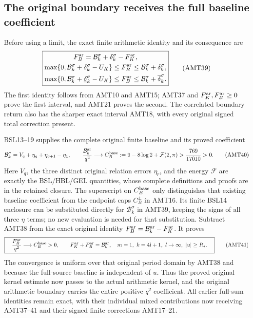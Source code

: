\documentclass[11pt,a4paper]{article}
\begin{document}
\subsection{The original boundary receives the full baseline coefficient}
Before using a limit, the exact finite arithmetic identity and its
consequence are
\[
\boxed{\begin{gathered}
 F_B^{\rm ar}=\mathcal B_k^\sigma+\delta_k^\sigma-F_K^{\rm ar},\\
 \max\{0,\mathcal B_k^\sigma+\delta_k^\sigma-U_K\}
    \le F_B^{\rm ar}\le\mathcal B_k^\sigma+\delta_k^\sigma,\\
 \max\{0,\mathcal B_k^\sigma+\underline\delta_k^\sigma-U_K\}
    \le F_B^{\rm ar}\le\mathcal B_k^\sigma+\overline\delta_k^\sigma.
\end{gathered}}\tag{AMT39}
\]
The first identity follows from AMT10 and AMT15; AMT37 and
$F_K^{\rm ar},F_B^{\rm ar}\ge0$ prove the first interval, and
AMT21 proves the second. The correlated boundary return also has
the sharper exact interval AMT18, with every original signed
total correction present.

BSL13--19 supplies the complete original finite baseline and its
proved coefficient
\[
 \mathcal B_k^\sigma=V_q+\eta_q+\eta_{q+1}-\eta_1,\qquad
 \frac{\mathcal B_k^{\rm ar}}{q^2}\longrightarrow
 C_B^{\rm base}:=9-8\log2+\mathcal F(2,\pi)
                      >\frac{769}{17010}>0.
 \tag{AMT40}
\]
Here $V_q$, the three distinct original relation errors $\eta_r$,
and the energy $\mathcal F$ are exactly the BSL/HBL/GEL quantities,
whose complete definitions and proofs are in the retained closure.
The superscript on $C_B^{\rm base}$ only distinguishes that existing
baseline coefficient from the endpoint caps $C_B^\pm$ in AMT16.
Its finite BSL14 enclosure can be substituted directly for
$\mathcal B_k^\sigma$ in AMT39, keeping the signs of all three
$\eta$ terms; no new evaluation is needed for that substitution.
Subtract AMT38 from the exact original identity
$F_B^{\rm ar}=\mathcal B_k^{\rm ar}-F_K^{\rm ar}$. It proves
\[
 \boxed{\quad
 \frac{F_B^{\rm ar}}{q^2}\longrightarrow C_B^{\rm base}>0,
 \qquad
 F_K^{\rm ar}+F_B^{\rm ar}=\mathcal B_k^{\rm ar},
 \quad m=1,\ k=4l+1,\ l\to\infty,\ |u|\ge R_*.
 \quad}\tag{AMT41}
\]
The convergence is uniform over that original period domain by
AMT38 and because the full-source baseline is independent of $u$.
Thus the proved original kernel estimate now passes to the actual
arithmetic kernel, and the original arithmetic boundary carries the
entire positive $q^2$ coefficient. All earlier full-sum identities
remain exact, with their individual mixed contributions now receiving
AMT37--41 and their signed finite corrections AMT17--21.
\end{document}
